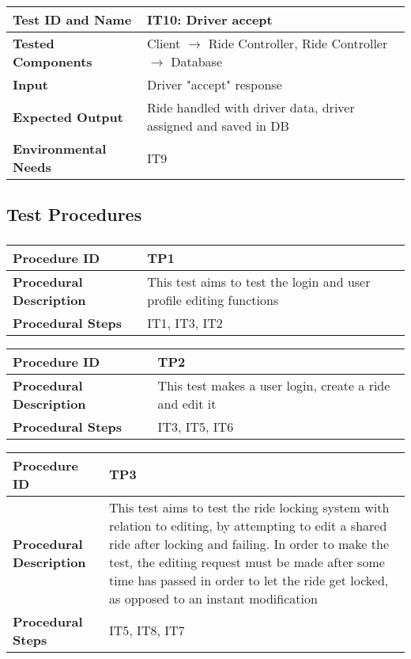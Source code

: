 \vspace{2em}

\noindent\begin{tabular}{l p{}}
    \hline
    \textbf{Test ID and Name} & \textbf{IT10: Driver accept}\\
    \hline
    \textbf{Tested Components} & Client $\rightarrow$ Ride Controller, Ride Controller $\rightarrow$ Database\\
    \hline
    \textbf{Input} & Driver "accept" response\\
    \hline
    \textbf{Expected Output} & Ride handled with driver data, driver assigned and saved in DB\\
    \hline
    \textbf{Environmental Needs} & IT9\\
    \hline
\end{tabular}

\subsection{Test Procedures}

\subsubsection{}

\noindent\begin{tabular}{l p{}}
    \hline
    \textbf{Procedure ID} & \textbf{TP1}\\
    \hline
    \textbf{Procedural Description} & This test aims to test the login and user profile editing functions \\
    \hline
    \textbf{Procedural Steps} & IT1, IT3, IT2\\
\end{tabular}

\noindent\begin{tabular}{l p{}}
    \hline
    \textbf{Procedure ID} & \textbf{TP2}\\
    \hline
    \textbf{Procedural Description} & This test makes a user login, create a ride and edit it\\
    \hline
    \textbf{Procedural Steps} & IT3, IT5, IT6\\
\end{tabular}

\noindent\begin{tabular}{l p{}}
    \hline
    \textbf{Procedure ID} & \textbf{TP3}\\
    \hline
    \textbf{Procedural Description} & This test aims to test the ride locking system with relation to editing, by attempting to edit a shared ride after locking and failing.
		In order to make the test, the editing request must be made after some time has passed in order to let the ride get locked, as opposed to an instant modification\\
    \hline
    \textbf{Procedural Steps} & IT5, IT8, IT7\\
\end{tabular}

